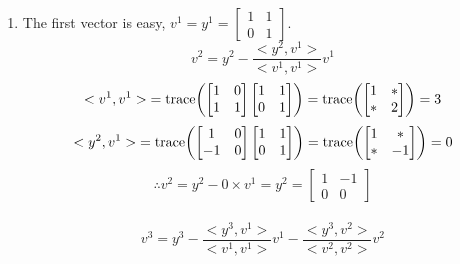 \documentclass[letterpaper]{article}
\begin{document}
\begin{enumerate}
\setlength{\itemsep}{.15in}
\renewcommand{\labelenumi}{(\alph{enumi})}
\item The first vector is easy, $v^1 = y^1= \begin{bmatrix}1 & 1 \\ 0 & 1 \end{bmatrix}$.\\

$$v^2= y^2 - \dfrac{<y^2, v^1>}{<v^1, v^1>} v^1$$
$${<v^1, v^1>} = \mathrm{trace}{\left(\begin{bmatrix}1 & 0 \\ 1 & 1 \end{bmatrix} \begin{bmatrix}1 & 1 \\ 0 & 1 \end{bmatrix}\right)} = \mathrm{trace}{\left(\begin{bmatrix}1 & * \\ * & 2 \end{bmatrix}\right)}= 3$$
$${<y^2, v^1>} = \mathrm{trace}{\left(\begin{bmatrix}1 & 0 \\ -1 & 0 \end{bmatrix} \begin{bmatrix}1 & 1 \\ 0 & 1 \end{bmatrix}\right)} = \mathrm{trace}{\left(\begin{bmatrix}1 & * \\ * & -1 \end{bmatrix}\right)}= 0$$
$$\therefore v^2 = y^2 - 0 \times v^1 = y^2 =\begin{bmatrix}1 & -1 \\ 0 & 0 \end{bmatrix}$$ \\
$$v^3= y^3 - \dfrac{<y^3, v^1>}{<v^1, v^1>} v^1 - \dfrac{<y^3, v^2>}{<v^2, v^2>} v^2$$


\end{enumerate}
\end{document}
